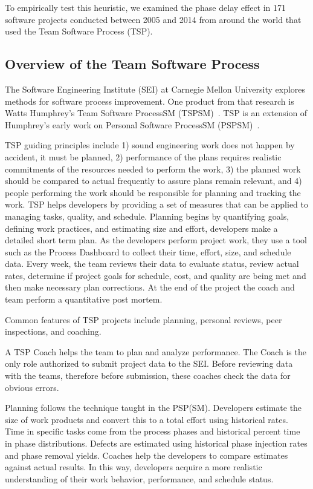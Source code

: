 To empirically test this heuristic, we examined the phase delay effect in
171 software projects conducted between 2005 and 2014 from around the world 
that used the Team Software Process (TSP). 

\subsection{Overview of the Team Software Process}
The Software Engineering Institute (SEI) at
Carnegie Mellon University explores methods for software process improvement.
One product from that research is  
Watts Humphrey's  Team Software ProcessSM (TSPSM)~\cite{tsp00}. TSP is an extension of Humphrey's early
work on Personal Software
ProcessSM (PSPSM)~\cite{psp05}.



TSP guiding principles include 1) sound engineering work does not happen by accident, it must be planned, 2) performance of the plans requires realistic commitments of the resources needed to perform the work, 3) the planned work should be compared to actual frequently to assure plans remain relevant, and 4) people performing the work should be responsible for planning and tracking the work. TSP helps developers by providing a set of measures that can be applied to managing tasks, quality, and schedule. Planning begins by quantifying goals, defining work practices, and estimating size and effort, developers make a detailed short term plan. As the developers perform project work, they use a tool such as the Process Dashboard to collect their time, effort, size, and schedule data. Every week, the team reviews their data to evaluate status, review actual rates, determine if project goals for schedule, cost, and quality are being met and then make necessary plan corrections. At the end of the project the coach and team perform a quantitative post mortem.

Common features of TSP projects include planning, personal reviews,  peer inspections, and coaching.
 
A TSP Coach helps the team to plan and analyze performance. The Coach is the only role authorized to submit project data to the SEI.
Before reviewing data with the teams, therefore before submission,
these coaches check the data for obvious errors.

Planning follows the technique taught in the PSP(SM). Developers estimate the size of work products and convert this to a total effort using historical rates. Time in specific tasks come from the  process phases and historical percent time in phase distributions. Defects are estimated using historical phase injection rates and phase removal yields. Coaches help the developers to compare estimates against actual results. In this way, developers acquire a more realistic understanding of their work behavior, performance, and schedule status.

